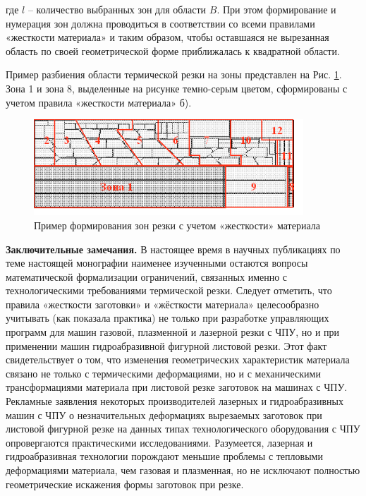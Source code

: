 \documentclass[12pt]{report}
\begin{document}
где $l$
– количество выбранных зон для области $B$.
При этом формирование и нумерация зон
должна проводиться в соответствии со всеми правилами
«жесткости материала» и таким образом,
чтобы оставшаяся не вырезанная область
по своей геометрической форме приближалась к квадратной области.

Пример разбиения области термической резки на зоны
представлен на
Рис. \ref{zones}.
Зона 1 и зона 8,
выделенные на рисунке темно-серым цветом,
сформированы с учетом правила «жесткости материала» б).

\begin{figure}
  \begin{center}
  \includegraphics[width=0.9\textwidth]{zones.png}
  \caption{Пример формирования зон резки с учетом «жесткости» материала}
  \label{zones}
  \end{center}
\end{figure}

{\bf Заключительные замечания.}
В настоящее время в научных публикациях по теме настоящей монографии
наименее изученными остаются вопросы математической формализации ограничений,
связанных именно с технологическими требованиями термической резки.
Следует отметить, что правила «жесткости заготовки» и «жёсткости материала»
целесообразно учитывать (как показала практика)
не только при разработке управляющих программ для машин газовой,
плазменной и лазерной резки с ЧПУ,
но и при применении машин гидроабразивной фигурной листовой резки.
Этот факт свидетельствует о том,
что изменения геометрических характеристик материала
связано не только с термическими деформациями,
но и с механическими трансформациями материала
при листовой резке заготовок на машинах с ЧПУ.
Рекламные заявления некоторых производителей
лазерных и гидроабразивных машин с ЧПУ о незначительных
деформациях вырезаемых заготовок при листовой фигурной
резке на данных типах технологического оборудования с ЧПУ
опровергаются практическими исследованиями.
Разумеется, лазерная и гидроабразивная технологии
порождают меньшие проблемы с тепловыми деформациями материала,
чем газовая и плазменная,
но не исключают полностью геометрические искажения формы заготовок при резке.
\end{document}

